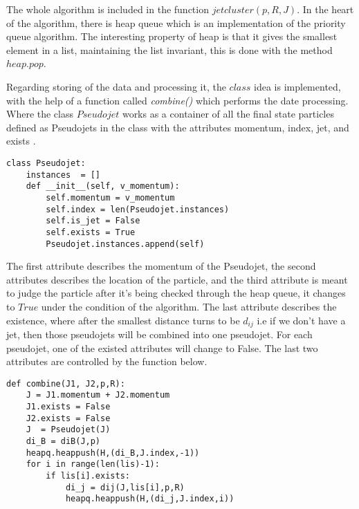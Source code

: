 \documentclass[10pt,a4paper]{article}
\begin{document}
The whole algorithm is included in the function $jetcluster(p,R,J)$. In the heart of the algorithm, there is heap queue which is an implementation of the priority queue algorithm. The interesting property of heap is that it gives the smallest element in a list, maintaining the list invariant, this is done with the method $heap.pop$.

Regarding storing of the data and processing it, the $class$ idea is implemented, with the help of a function called \textit{combine()} which performs the date processing.  Where the class $Pseudojet$ works as a container of all the final state particles defined as Pseudojets in the class with the attributes momentum, index, jet, and exists .
\begin{verbatim}
class Pseudojet:
    instances  = []
    def __init__(self, v_momentum):
        self.momentum = v_momentum
        self.index = len(Pseudojet.instances)
        self.is_jet = False
        self.exists = True 
        Pseudojet.instances.append(self)
\end{verbatim}  

The first attribute describes the momentum of the Pseudojet, the second attributes describes the location of the particle, and the third attribute is meant to judge the particle after it's being checked through the heap queue, it changes to $True$ under the condition of the algorithm. The last attribute describes the existence, where after the smallest distance turns to be $d_{ij}$ i.e if we don't have a jet, then those pseudojets will be combined into one pseudojet. For each pseudojet, one of the existed attributes will change to False. The last two attributes are controlled by the function below. \begin{verbatim}
def combine(J1, J2,p,R):
    J = J1.momentum + J2.momentum
    J1.exists = False
    J2.exists = False
    J  = Pseudojet(J)
    di_B = diB(J,p)
    heapq.heappush(H,(di_B,J.index,-1))
    for i in range(len(lis)-1):
        if lis[i].exists:
            di_j = dij(J,lis[i],p,R)
            heapq.heappush(H,(di_j,J.index,i))
\end{verbatim}        
\end{document}
